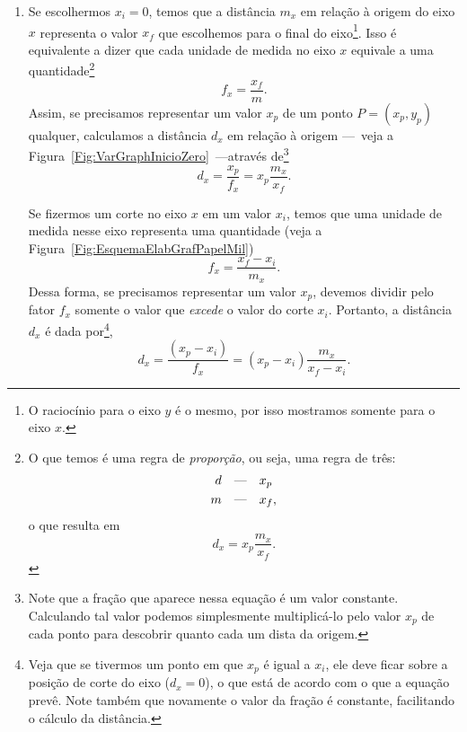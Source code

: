 \begin{enumerate}
	\item Se escolhermos $x_i = 0$, temos que a distância $m_x$ em relação à origem do eixo $x$ representa o valor $x_f$ que escolhemos para o final do eixo\footnote{O raciocínio para o eixo $y$ é o mesmo, por isso mostramos somente para o eixo $x$.}. Isso é equivalente a dizer que cada unidade de medida no eixo $x$ equivale a uma quantidade\footnote{O que temos é uma regra de \emph{proporção}, ou seja, uma regra de três: \begin{align} d &\quad\text{\textemdash}\quad x_p \\ m &\quad\text{\textemdash}\quad x_f, \end{align} o que resulta em \begin{equation} d_x = x_p \frac{m_x}{x_f}. \end{equation}}
	\begin{equation}
		f_x = \frac{x_f}{m}.
	\end{equation}
	Assim, se precisamos representar um valor $x_p$ de um ponto $P = (x_p,y_p)$ qualquer, calculamos a distância $d_x$ em relação à origem ---~veja a Figura~\ref{Fig:VarGraphInicioZero}~---através de\footnote{Note que a fração que aparece nessa equação é um valor constante. Calculando tal valor podemos simplesmente multiplicá-lo pelo valor $x_p$ de cada ponto para descobrir quanto cada um dista da origem.}
	\begin{equation}
		d_x = \frac{x_p}{f_x} = x_p \frac{m_x}{x_f}.
	\end{equation}

	Se fizermos um corte no eixo $x$ em um valor $x_i$, temos que uma unidade de medida nesse eixo representa uma quantidade (veja a Figura~\ref{Fig:EsquemaElabGrafPapelMil})
	\begin{equation}
		f_x = \frac{x_f-x_i}{m_x}.
	\end{equation}
	Dessa forma, se precisamos representar um valor $x_p$, devemos dividir pelo fator $f_x$ somente o valor que \emph{excede} o valor do corte $x_i$. Portanto, a distância $d_x$ é dada por\footnote{Veja que se tivermos um ponto em que $x_p$ é igual a $x_i$, ele deve ficar sobre a posição de corte do eixo ($d_x = 0$), o que está de acordo com o que a equação prevê. Note também que novamente o valor da fração é constante, facilitando o cálculo da distância.},
	\begin{equation}\label{Eq:DistDX}
		d_x = \frac{(x_p-x_i)}{f_x} = (x_p-x_i)\frac{m_x}{x_f-x_i}.
	\end{equation}
	

\end{enumerate}
